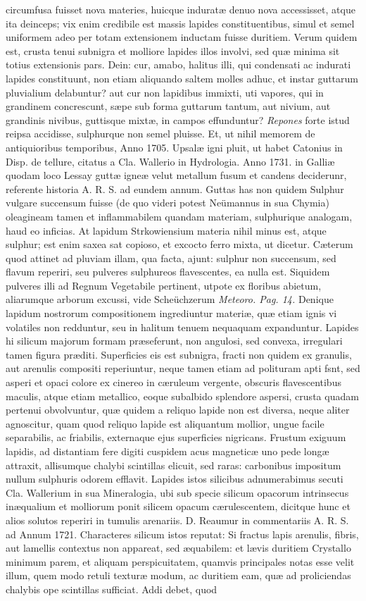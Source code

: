 \documentclass[a4paper, 11pt, oneside, polutonikogreek, latin]{article}
\begin{document}
circumfusa fuisset nova materies, huicque induratæ denuo nova accessisset, atque ita deinceps; vix enim credibile est massis lapides constituentibus, simul et semel uniformem adeo per totam extensionem inductam fuisse duritiem. Verum quidem est, crusta tenui subnigra et molliore lapides illos involvi, sed quæ minima sit totius extensionis pars. Dein: cur, amabo, halitus illi, qui condensati ac indurati lapides constituunt, non etiam aliquando saltem molles adhuc, et instar guttarum pluvialium delabuntur? aut cur non lapidibus immixti, uti vapores, qui in grandinem concrescunt, sæpe sub forma guttarum tantum, aut nivium, aut grandinis nivibus, guttisque mixtæ, in campos effunduntur? \emph{Repones} forte istud reipsa accidisse, sulphurque non semel pluisse. Et, ut nihil memorem de antiquioribus temporibus, Anno 1705. Upsalæ igni pluit, ut habet Catonius in Disp. de tellure, citatus a Cla. Wallerio in Hydrologia. Anno 1731. in Galliæ quodam loco Lessay guttæ igneæ velut metallum fusum et candens deciderunr, referente historia A. R. S. ad eundem annum. Guttas has non quidem Sulphur vulgare succensum fuisse (de quo videri potest Neümannus in sua Chymia) oleagineam tamen et inflammabilem quandam materiam, sulphurique analogam, haud eo inficias. At lapidum Strkowiensium materia nihil minus est, atque sulphur; est enim saxea sat copioso, et excocto ferro mixta, ut dicetur. Cæterum quod attinet ad pluviam illam, qua facta, ajunt: sulphur non succensum, sed flavum reperiri, seu pulveres sulphureos flavescentes, ea nulla est. Siquidem pulveres illi ad Regnum Vegetabile pertinent, utpote ex floribus abietum, aliarumque arborum excussi, vide Scheüchzerum \emph{Meteoro. Pag. 14.} Denique lapidum nostrorum compositionem ingrediuntur materiæ, quæ etiam ignis vi volatiles non redduntur, seu in halitum tenuem nequaquam expanduntur. Lapides hi silicum majorum formam præseferunt, non angulosi, sed convexa, irregulari tamen figura præditi. Superficies eis est subnigra, fracti non quidem ex granulis, aut arenulis compositi reperiuntur, neque tamen etiam ad polituram apti fsnt, sed asperi et opaci colore ex cinereo in cæruleum vergente, obscuris flavescentibus maculis, atque etiam metallico, eoque subalbido splendore aspersi, crusta quadam pertenui obvolvuntur, quæ quidem a reliquo lapide non est diversa, neque aliter agnoscitur, quam quod reliquo lapide est aliquantum mollior, ungue facile separabilis, ac friabilis, externaque ejus superficies nigricans. Frustum exiguum lapidis, ad distantiam fere digiti cuspidem acus magneticæ uno pede longæ attraxit, allisumque chalybi scintillas elicuit, sed raras: carbonibus impositum nullum sulphuris odorem efflavit. Lapides istos silicibus adnumerabimus secuti Cla. Wallerium in sua Mineralogia, ubi sub specie silicum opacorum intrinsecus inæqualium et molliorum ponit silicem opacum cærulescentem, dicitque hunc et alios solutos reperiri in tumulis arenariis. D. Reaumur in commentariis A. R. S. ad Annum 1721. Characteres silicum istos reputat: Si fractus lapis arenulis, fibris, aut lamellis contextus non appareat, sed æquabilem: et lævis duritiem Crystallo minimum parem, et aliquam perspicuitatem, quamvis principales notas esse velit illum, quem modo retuli texturæ modum, ac duritiem eam, quæ ad proliciendas chalybis ope scintillas sufficiat. Addi debet, quod 
\end{document}
